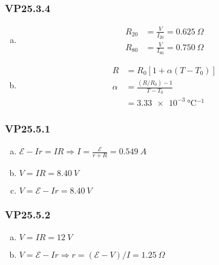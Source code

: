 \documentclass{article}
\begin{document}
\subsubsection{VP25.3.4}

\begin{enumerate}[(a)]
  \item

        \begin{align*}
          R_{20} & = \frac{V}{I_{20}} = \qty{0.625}{\Omega} \\
          R_{80} & = \frac{V}{I_{80}} = \qty{0.750}{\Omega}
        \end{align*}

  \item

        \begin{align*}
          R      & = R_0 [1 + \alpha (T - T_0)]         \\
          \alpha & = \frac{(R / R_0) - 1}{T - T_0}      \\
                 & = \qty{3.33e-3}{\degreeCelsius^{-1}}
        \end{align*}
\end{enumerate}

\subsubsection{VP25.5.1}

\begin{enumerate}[(a)]
  \item $\mathcal{E} - I r = I R \Rightarrow I = \frac{\mathcal{E}}{r + R} = \qty{0.549}{A}$

  \item $V = I R = \qty{8.40}{V}$

  \item $V = \mathcal{E} - I r = \qty{8.40}{V}$
\end{enumerate}

\subsubsection{VP25.5.2}

\begin{enumerate}[(a)]
  \item $V = I R = \qty{12}{V}$

  \item $V = \mathcal{E} - I r \Rightarrow r = (\mathcal{E} - V) / I = \qty{1.25}{\Omega}$
\end{enumerate}
\end{document}
